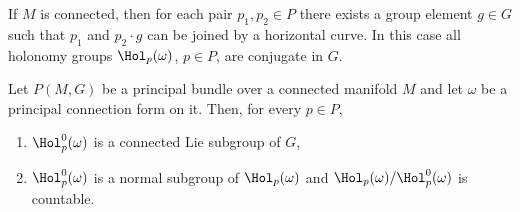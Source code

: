 If $M$ is connected, then for each pair $p_1,p_2\in P$ there exists a group element $g\in G$ such that $p_1$ and $p_2\cdot g$ can be joined by a horizontal curve. In this case all holonomy groups $\Hol_p(\omega)$, $p\in P$, are conjugate in $G$.

\begin{thm}[{{\cite[Thm.~1.7.9]{RS2}}}]\label{thm 1.7.9 RS2}
    Let $P(M,G)$ be a principal bundle over a connected manifold $M$ and let $\omega$ be a principal connection form on it. Then, for every $p\in P$,
    \begin{enumerate}
        \item $\Hol_p^0(\omega)$ is a connected Lie subgroup of $G$,
        \item $\Hol_p^0(\omega)$ is a normal subgroup of $\Hol_p(\omega)$ and $\Hol_p(\omega)\slash \Hol_p^0(\omega)$ is countable.
    \end{enumerate}
\end{thm}
